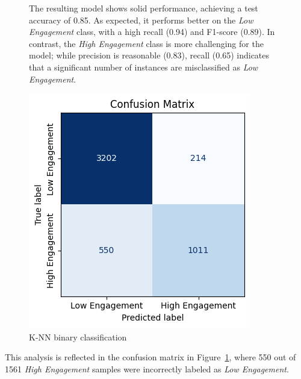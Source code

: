 \begin{figure}[H]
\begin{minipage}[t]{0.60\textwidth}
        The resulting model shows solid performance, achieving a test accuracy of 0.85. As expected, it performs better on the \textit{Low Engagement} class, with a high recall (0.94) and F1-score (0.89). 
        In contrast, the \textit{High Engagement} class is more challenging for the model; while precision is reasonable (0.83), recall (0.65) indicates that a significant number of instances are misclassified as 
        \textit{Low Engagement}.
    \end{minipage}
    \hfill
    \begin{minipage}[t]{0.35\textwidth}
        \vspace{0pt}
        \centering
        \includegraphics[width=\linewidth]{plots/knn_binary_confmatrix.png}
        \captionsetup{justification=centering, width=0.90\linewidth}
        \caption{K-NN binary classification}
        \label{fig:binary_knn_confusion_matrix}
    \end{minipage}
\end{figure}

This analysis is reflected in the confusion matrix in Figure~\ref{fig:binary_knn_confusion_matrix}, where 550 out of 1561 \textit{High Engagement} samples were incorrectly labeled as \textit{Low Engagement}.\\

